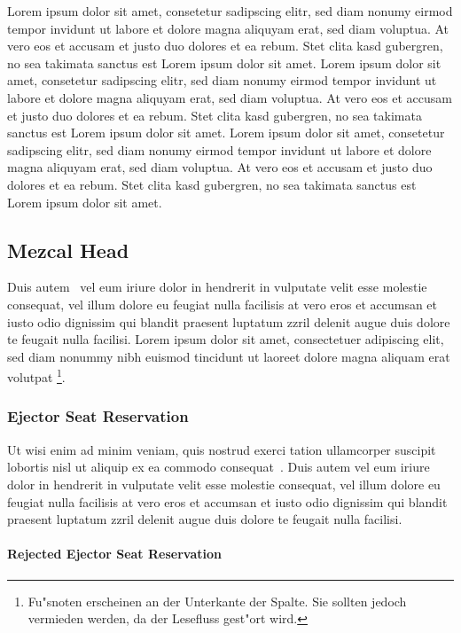 \documentclass[journal]{vgtc}
\begin{document}
Lorem ipsum dolor sit amet, consetetur sadipscing elitr, sed diam
nonumy eirmod tempor invidunt ut labore et dolore magna aliquyam erat,
sed diam voluptua. At vero eos et accusam et justo duo dolores et ea
rebum. Stet clita kasd gubergren, no sea takimata sanctus est Lorem
ipsum dolor sit amet. Lorem ipsum dolor sit amet, consetetur
sadipscing elitr, sed diam nonumy eirmod tempor invidunt ut labore et
dolore magna aliquyam erat, sed diam voluptua. At vero eos et accusam
et justo duo dolores et ea rebum. Stet clita kasd gubergren, no sea
takimata sanctus est Lorem ipsum dolor sit amet. Lorem ipsum dolor sit
amet, consetetur sadipscing elitr, sed diam nonumy eirmod tempor
invidunt ut labore et dolore magna aliquyam erat, sed diam
voluptua. At vero eos et accusam et justo duo dolores et ea
rebum. Stet clita kasd gubergren, no sea takimata sanctus est Lorem
ipsum dolor sit amet.


\subsection{Mezcal Head}

Duis autem~\cite{Lorensen:1987:MCA} vel eum iriure dolor in hendrerit
in vulputate velit esse molestie consequat, vel illum dolore eu
feugiat nulla facilisis at vero eros et accumsan et iusto odio
dignissim qui blandit praesent luptatum zzril delenit augue duis
dolore te feugait nulla facilisi. Lorem ipsum dolor sit amet,
consectetuer adipiscing elit, sed diam nonummy nibh euismod tincidunt
ut laoreet dolore magna aliquam erat volutpat%
\footnote{Fu"snoten erscheinen an der Unterkante der Spalte. Sie
  sollten jedoch vermieden werden, da der Lesefluss gest"ort wird.}.


\subsubsection{Ejector Seat Reservation}

Ut wisi enim ad minim veniam, quis nostrud exerci tation ullamcorper
suscipit lobortis nisl ut aliquip ex ea commodo
consequat~\cite{Nielson:1991:TAD}. Duis autem vel eum iriure dolor in
hendrerit in vulputate velit esse molestie consequat, vel illum dolore
eu feugiat nulla facilisis at vero eros et accumsan et iusto odio
dignissim qui blandit praesent luptatum zzril delenit augue duis
dolore te feugait nulla facilisi.

\paragraph{Rejected Ejector Seat Reservation}
\end{document}
